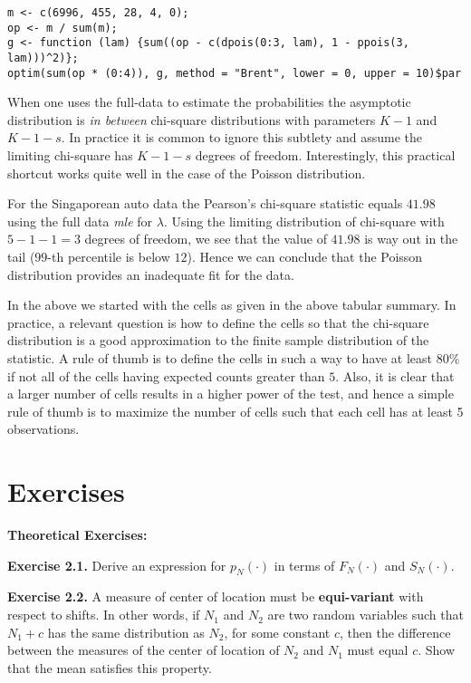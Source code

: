 \documentclass[]{book}
\theoremstyle{definition}
\theoremstyle{definition}
\theoremstyle{definition}
\theoremstyle{remark}
\begin{document}
\begin{verbatim}
m <- c(6996, 455, 28, 4, 0);
op <- m / sum(m);
g <- function (lam) {sum((op - c(dpois(0:3, lam), 1 - ppois(3, lam)))^2)};
optim(sum(op * (0:4)), g, method = "Brent", lower = 0, upper = 10)$par
\end{verbatim}

When one uses the full-data to estimate the probabilities the asymptotic
distribution is \emph{in between} chi-square distributions with
parameters \(K-1\) and \(K-1-s\). In practice it is common to ignore
this subtlety and assume the limiting chi-square has \(K-1-s\) degrees
of freedom. Interestingly, this practical shortcut works quite well in
the case of the Poisson distribution.

For the Singaporean auto data the Pearson's chi-square statistic equals
\(41.98\) using the full data \emph{mle} for \({\lambda}\). Using the
limiting distribution of chi-square with \(5-1-1=3\) degrees of freedom,
we see that the value of \(41.98\) is way out in the tail (\(99\)-th
percentile is below \(12\)). Hence we can conclude that the Poisson
distribution provides an inadequate fit for the data.

In the above we started with the cells as given in the above tabular
summary. In practice, a relevant question is how to define the cells so
that the chi-square distribution is a good approximation to the finite
sample distribution of the statistic. A rule of thumb is to define the
cells in such a way to have at least \(80\%\) if not all of the cells
having expected counts greater than \(5\). Also, it is clear that a
larger number of cells results in a higher power of the test, and hence
a simple rule of thumb is to maximize the number of cells such that each
cell has at least 5 observations.

\section{Exercises}\label{S:exercises}

\textbf{Theoretical Exercises:}

\textbf{Exercise 2.1.} Derive an expression for \(p_N(\cdot)\) in terms
of \(F_N(\cdot)\) and \(S_N(\cdot)\).

\textbf{Exercise 2.2.} A measure of center of location must be
\textbf{equi-variant} with respect to shifts. In other words, if \(N_1\)
and \(N_2\) are two random variables such that \(N_1+c\) has the same
distribution as \(N_2\), for some constant \(c\), then the difference
between the measures of the center of location of \(N_2\) and \(N_1\)
must equal \(c\). Show that the mean satisfies this property.
\end{document}
